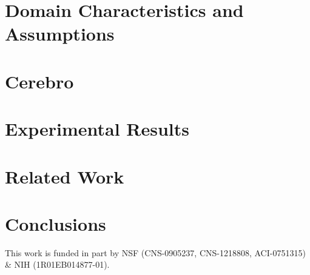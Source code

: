 \documentclass[10pt]{socc15}
\begin{document}
\vspace{-0.10in}
\section{Domain Characteristics and Assumptions}
\label{sec:approach}



\vspace{-0.10in}
\section{Cerebro}
\label{sec:design}
%


%

\vspace{-0.10in}
\section{Experimental Results}
\label{sec:results}


\vspace{-0.10in}
\section{Related Work}
\label{sec:related_work}


\vspace{-0.10in}
\section{Conclusions}
\label{sec:conclusions}




\acks
This work is funded in part by NSF (CNS-0905237, CNS-1218808, ACI-0751315) \& NIH
(1R01EB014877-01).


\softraggedright





\end{document}
